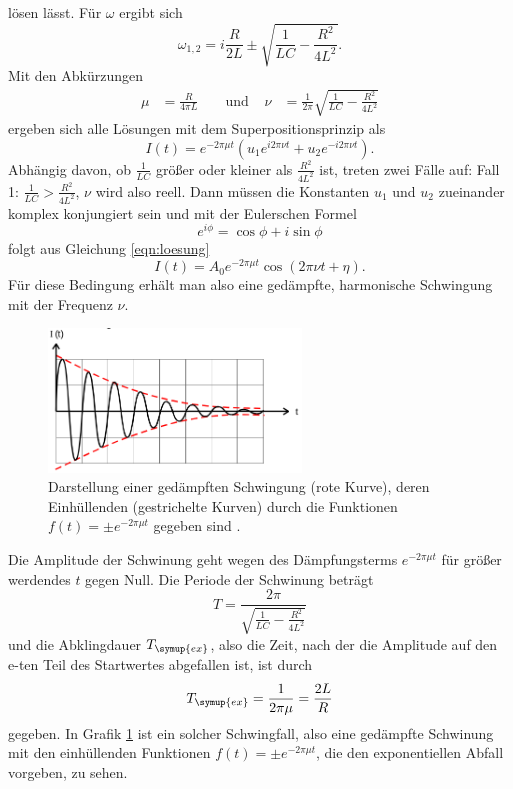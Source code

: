lösen lässt. Für $\omega$ ergibt sich
\begin{equation}
  \omega_{1,2} = i \frac{R}{2L}\pm \sqrt{\frac{1}{L C} - \frac{R^2}{4L^2}}.
  \label{eqn:omega12}
\end{equation}
Mit den Abkürzungen
\begin{align*}
  \mu &= \frac{R}{4 \pi L} & &\text{ und } &
  \nu &= \frac{1}{2\pi} \sqrt{\frac{1}{L C} - \frac{R^2}{4 L^2}}
\end{align*}
ergeben sich alle Lösungen mit dem Superpositionsprinzip als
\begin{equation}
  I(t) = e^{-2 \pi \mu t} (u_1 e^{i 2 \pi \nu t} + u_2 e^{-i 2 \pi \nu t}).
  \label{eqn:loesung}
\end{equation}
Abhängig davon, ob $\frac{1}{L C}$ größer oder kleiner als $\frac{R^2}{4L^2}$ ist,
treten zwei Fälle auf: \newline
Fall 1: $\frac{1}{L C} > \frac{R^2}{4L^2}$, $\nu$ wird also reell. Dann müssen
die Konstanten $u_1$ und $u_2$ zueinander komplex konjungiert sein und mit der
Eulerschen Formel
\begin{equation}
  e^{i\phi} = \cos{\phi} + i \sin{\phi}
  \label{eqn:euler}
\end{equation}
folgt aus Gleichung \eqref{eqn:loesung}
\begin{equation}
  I(t) = A_0 e^{-2\pi\mu t}\cos{(2\pi\nu t + \eta)}.
  \label{eqn:gedaempfte_schwingung}
\end{equation}
Für diese Bedingung erhält man also eine gedämpfte, harmonische Schwingung mit der
Frequenz $\nu$.
\begin{figure}
  \centering
  \includegraphics[width=0.6\textwidth]{gedaempfte_schwingung.png}
  \caption{Darstellung einer gedämpften Schwingung (rote Kurve), deren Einhüllenden
  (gestrichelte Kurven) durch die Funktionen $f(t)=\pm e^{-2\pi\mu t}$ gegeben
  sind \cite{sample}.}
  \label{fig:gedaempfte_schwingung}
\end{figure}
Die Amplitude der Schwinung geht wegen des Dämpfungsterms
$e^{-2\pi\mu t}$ für größer werdendes $t$ gegen Null. Die Periode der Schwinung
beträgt
\begin{equation}
  T = \frac{2\pi}{\sqrt{\frac{1}{L C}-\frac{R^2}{4 L^2}}}
  \label{eqn:periode}
\end{equation}
und die Abklingdauer $T_\symup{ex}$, also die Zeit, nach der die Amplitude auf den
e-ten Teil des Startwertes abgefallen ist, ist durch
\begin{equation}
  T_\symup{ex} = \frac{1}{2\pi\mu} = \frac{2L}{R}
  \label{eqn:abklingzeit}
\end{equation}
gegeben. In Grafik \ref{fig:gedaempfte_schwingung} ist ein solcher Schwingfall,
also eine gedämpfte Schwinung mit den einhüllenden Funktionen $f(t)=\pm e^{-2\pi\mu t}$,
die den exponentiellen Abfall vorgeben, zu sehen.


